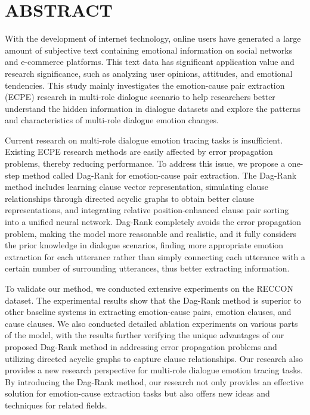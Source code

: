 \clearpage
{}

\titlespacing{\chapter}{0pt}{0mm}{5mm}
\chapter*{ABSTRACT}

With the development of internet technology, online users have generated a large amount of subjective text containing emotional information on social networks and e-commerce platforms. This text data has significant application value and research significance, such as analyzing user opinions, attitudes, and emotional tendencies. This study mainly investigates the emotion-cause pair extraction (ECPE)  research in multi-role dialogue scenario to help researchers better understand the hidden information in dialogue datasets and explore the patterns and characteristics of multi-role dialogue emotion changes.


Current research on multi-role dialogue emotion tracing tasks is insufficient. Existing ECPE research methods are easily affected by error propagation problems, thereby reducing performance. To address this issue, we propose a one-step method called Dag-Rank for emotion-cause pair extraction. The Dag-Rank method includes learning clause vector representation, simulating clause relationships through directed acyclic graphs to obtain better clause representations, and integrating relative position-enhanced clause pair sorting into a unified neural network. Dag-Rank completely avoids the error propagation problem, making the model more reasonable and realistic, and it fully considers the prior knowledge in dialogue scenarios, finding more appropriate emotion extraction for each utterance rather than simply connecting each utterance with a certain number of surrounding utterances, thus better extracting information.

To validate our method, we conducted extensive experiments on the RECCON dataset. The experimental results show that the Dag-Rank method is superior to other baseline systems in extracting emotion-cause pairs, emotion clauses, and cause clauses. We also conducted detailed ablation experiments on various parts of the model, with the results further verifying the unique advantages of our proposed Dag-Rank method in addressing error propagation problems and utilizing directed acyclic graphs to capture clause relationships.
Our research also provides a new research perspective for multi-role dialogue emotion tracing tasks. By introducing the Dag-Rank method, our research not only provides an effective solution for emotion-cause extraction tasks but also offers new ideas and techniques for related fields. 


